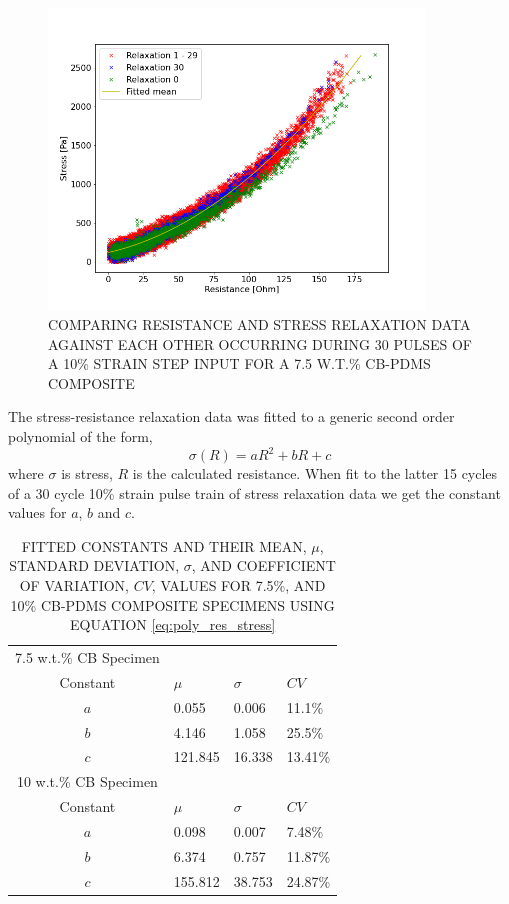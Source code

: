 \begin{figure}[H]
	\centering
	\includegraphics[width=10cm]{Figures/relax_res_stress_non_lin_rgby_MAF8_2_7-5_Epin_20mm_v3.png}
	\caption{COMPARING RESISTANCE AND STRESS RELAXATION DATA AGAINST EACH OTHER OCCURRING DURING 30 PULSES OF A 10\% STRAIN STEP INPUT FOR A 7.5 W.T.\% CB-PDMS COMPOSITE}
	\label{fig:res_vs_stress_30pulses}
\end{figure}
The stress-resistance relaxation data was fitted to a generic second order polynomial of the form, 
\begin{equation}
	\sigma(R) = aR^2+bR+c
	\label{eq:poly_res_stress}
\end{equation}
where $\sigma$ is stress, $R$ is the calculated resistance. When fit to the latter 15 cycles of a 30 cycle 10\% strain pulse train of stress relaxation data we get the constant values for $a$, $b$ and $c$.
\begin{table}[H]
	\caption{FITTED CONSTANTS AND THEIR MEAN, $\mu$, STANDARD DEVIATION, $\sigma$, AND COEFFICIENT OF VARIATION, $CV$, VALUES FOR 7.5\%, AND 10\% CB-PDMS COMPOSITE SPECIMENS USING EQUATION \ref{eq:poly_res_stress}}
	\begin{center}
		\label{tab:generalised_model_constants}
		\begin{tabular}{c l l l}
			7.5 w.t.\% CB Specimen \\
			Constant & $\mu$ & $\sigma$ & $CV$ \\
			\hline
			$a$ & 0.055 & 0.006 & 11.1\% \\
			$b$ & 4.146 & 1.058 & 25.5\% \\
			$c$ & 121.845 & 16.338 & 13.41\% \\
			\hline
			10 w.t.\% CB Specimen \\
			Constant & $\mu$ & $\sigma$ & $CV$ \\
			\hline
			$a$ & 0.098 & 0.007 & 7.48\% \\
			$b$ & 6.374 & 0.757 & 11.87\% \\
			$c$ & 155.812 & 38.753 & 24.87\% \\
			\hline
		\end{tabular}
	\end{center}
\end{table}


